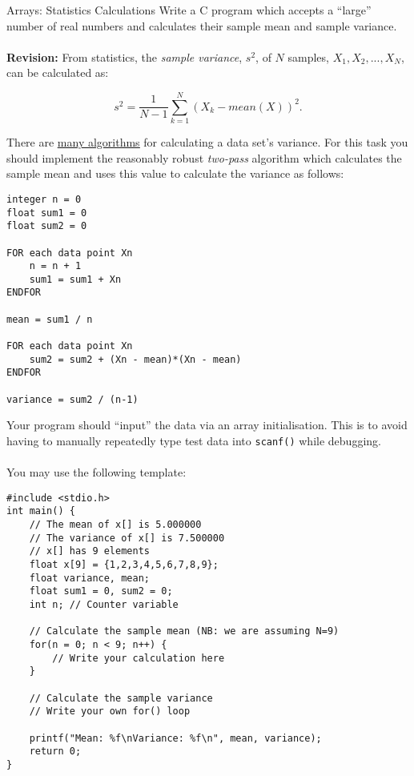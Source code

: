 \documentclass{lab}
\begin{document}
\pagebreak
\begin{task}{Arrays: Statistics Calculations}{}
Write a C program which accepts a ``large'' number of real numbers and calculates their sample mean and sample variance.
\\~\\
\textbf{Revision:} From statistics, the \textit{sample variance}, $s^2$, of $N$ samples, $X_1, X_2, ... , X_N$, can be calculated as:

\begin{equation}\label{eq:var}
s^2 = \frac{1}{N-1}\sum_{k=1}^{N}(X_k - mean(X))^2.
\end{equation}

There are \underline{\href{https://en.wikipedia.org/wiki/Algorithms_for_calculating_variance}{many algorithms}} for calculating a data set's variance. For this task you should implement the reasonably robust \textit{two-pass} algorithm which calculates the sample mean and uses this value to calculate the variance as follows:
\begin{lstlisting}[style=pseudo]
integer n = 0
float sum1 = 0
float sum2 = 0

FOR each data point Xn
	n = n + 1
	sum1 = sum1 + Xn
ENDFOR

mean = sum1 / n

FOR each data point Xn
	sum2 = sum2 + (Xn - mean)*(Xn - mean)
ENDFOR

variance = sum2 / (n-1)
\end{lstlisting}

Your program should ``input'' the data via an array initialisation. This is to avoid having to manually repeatedly type test data into \texttt{scanf()} while debugging.
\\~\\
You may use the following template:
\begin{lstlisting}[style=Ctable]
#include <stdio.h>
int main() {
	// The mean of x[] is 5.000000
	// The variance of x[] is 7.500000
	// x[] has 9 elements
	float x[9] = {1,2,3,4,5,6,7,8,9};
	float variance, mean;
	float sum1 = 0, sum2 = 0;
	int n; // Counter variable
	
	// Calculate the sample mean (NB: we are assuming N=9)
	for(n = 0; n < 9; n++) {
		// Write your calculation here
	}	
	
	// Calculate the sample variance
	// Write your own for() loop
	
	printf("Mean: %f\nVariance: %f\n", mean, variance);
	return 0;
}
\end{lstlisting}
\end{task}
\end{document}
